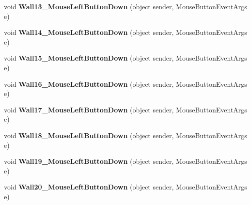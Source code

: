 \begin{DoxyCompactItemize}
\item 
\mbox{\label{class_r6_1_1_border_window_a83ae9379c050721344d6d15411362c58}} 
void {\bfseries Wall13\+\_\+\+Mouse\+Left\+Button\+Down} (object sender, Mouse\+Button\+Event\+Args e)
\item 
\mbox{\label{class_r6_1_1_border_window_ae30d080eae97e9d2f19bec5a9f194f8a}} 
void {\bfseries Wall14\+\_\+\+Mouse\+Left\+Button\+Down} (object sender, Mouse\+Button\+Event\+Args e)
\item 
\mbox{\label{class_r6_1_1_border_window_aacac724372380a72be1fccc26477d50d}} 
void {\bfseries Wall15\+\_\+\+Mouse\+Left\+Button\+Down} (object sender, Mouse\+Button\+Event\+Args e)
\item 
\mbox{\label{class_r6_1_1_border_window_ac829a0992d89fdc95e7462200ebae3b6}} 
void {\bfseries Wall16\+\_\+\+Mouse\+Left\+Button\+Down} (object sender, Mouse\+Button\+Event\+Args e)
\item 
\mbox{\label{class_r6_1_1_border_window_a3df9b0a28842c5ad7c4b622f40409d52}} 
void {\bfseries Wall17\+\_\+\+Mouse\+Left\+Button\+Down} (object sender, Mouse\+Button\+Event\+Args e)
\item 
\mbox{\label{class_r6_1_1_border_window_a491096047b93a6656c17e256b54dac84}} 
void {\bfseries Wall18\+\_\+\+Mouse\+Left\+Button\+Down} (object sender, Mouse\+Button\+Event\+Args e)
\item 
\mbox{\label{class_r6_1_1_border_window_a7fb26208661af9aeadea4eddbd9e1604}} 
void {\bfseries Wall19\+\_\+\+Mouse\+Left\+Button\+Down} (object sender, Mouse\+Button\+Event\+Args e)
\item 
\mbox{\label{class_r6_1_1_border_window_a8eb60eab43a57995f13a1f2ae627cb71}} 
void {\bfseries Wall20\+\_\+\+Mouse\+Left\+Button\+Down} (object sender, Mouse\+Button\+Event\+Args e)
\item 
\mbox{\label{class_r6_1_1_border_window_a0db109da2b1d6871db3df52a1c496dbf}} 

\end{DoxyCompactItemize}
